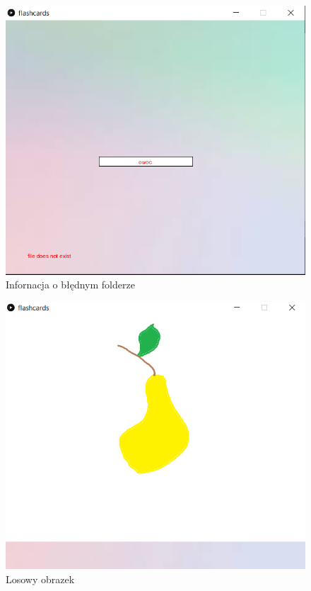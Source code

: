 \documentclass[11pt]{article}
\begin{document}
    \begin{figure}\label{ss1}
        \centering
        \includegraphics{Screenshot_1.png}
        \caption{Infornacja o błędnym folderze}
    \end{figure}

    \begin{figure}\label{ss2}
    \centering
    \includegraphics{Screenshot_2.png}
    \caption{Losowy obrazek}
    \end{figure}
\end{document}
